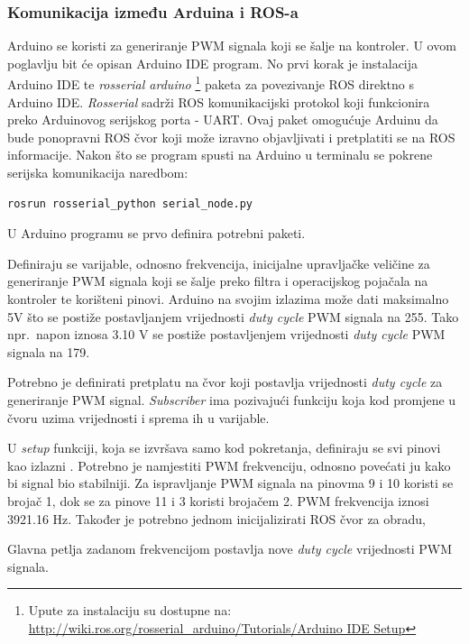 \documentclass[times, utf8, diplomski]{fer}
\begin{document}
\subsubsection{Komunikacija između Arduina i ROS-a}
Arduino se koristi za generiranje PWM signala koji se šalje na kontroler. U ovom poglavlju bit će opisan Arduino IDE program. No prvi korak je instalacija Arduino IDE te \emph{rosserial arduino} \footnote{Upute za instalaciju su dostupne na: \url{http://wiki.ros.org/rosserial_arduino/Tutorials/Arduino IDE Setup}} paketa za povezivanje ROS direktno s Arduino IDE. \emph{Rosserial} sadrži ROS komunikacijski protokol koji funkcionira preko Arduinovog serijskog porta - UART. Ovaj paket omogućuje Arduinu da bude ponopravni ROS čvor koji može izravno objavljivati i pretplatiti se na ROS informacije. Nakon što se program spusti na Arduino u terminalu se pokrene serijska komunikacija naredbom:
\begin{lstlisting}
rosrun rosserial_python serial_node.py
\end{lstlisting}
U Arduino programu se prvo definira potrebni paketi.

Definiraju se varijable, odnosno frekvencija, inicijalne upravljačke veličine za generiranje PWM signala koji se šalje preko filtra i operacijskog pojačala na kontroler te korišteni pinovi. Arduino na svojim izlazima može dati maksimalno 5V što se postiže postavljanjem vrijednosti \emph{duty cycle} PWM signala na 255. Tako npr.~napon iznosa 3.10 V se postiže postavljenjem vrijednosti \emph{duty cycle} PWM signala na 179.

Potrebno je definirati pretplatu  na čvor  koji postavlja vrijednosti \emph{duty cycle} za generiranje PWM signal. \emph{Subscriber} ima pozivajući funkciju koja kod promjene u čvoru uzima vrijednosti i sprema ih u varijable.

U \emph{setup} funkciji, koja se izvršava samo kod pokretanja, definiraju se svi pinovi kao izlazni . Potrebno je namjestiti PWM frekvenciju, odnosno povećati ju kako bi signal bio stabilniji. Za ispravljanje PWM signala na pinovma 9 i 10 koristi se brojač 1, dok se za pinove 11 i 3 koristi brojačem 2. PWM frekvencija iznosi 3921.16 Hz. Također je potrebno jednom inicijalizirati ROS čvor za obradu, 

Glavna petlja zadanom frekvencijom postavlja nove \emph{duty cycle} vrijednosti PWM signala.

\end{document}
